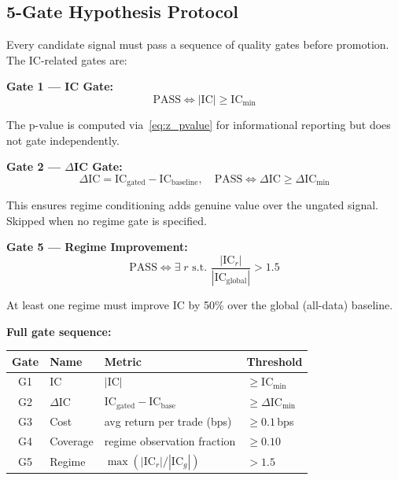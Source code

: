 \documentclass[11pt,a4paper]{article}
\newcommand{\toprule}{\hline\hline}
\newcommand{\midrule}{\hline}
\newcommand{\bottomrule}{\hline\hline}
\begin{document}
\subsection{5-Gate Hypothesis Protocol}

Every candidate signal must pass a sequence of quality gates before
promotion. The IC-related gates are:

\medskip

\textbf{Gate 1 --- IC Gate:}
\begin{equation}
    \text{PASS} \iff |\mathrm{IC}| \geq \mathrm{IC}_{\min}
    \label{eq:gate1}
\end{equation}

The p-value is computed via~\eqref{eq:z_pvalue} for informational
reporting but does not gate independently.

\medskip

\textbf{Gate 2 --- $\Delta$IC Gate:}
\begin{equation}
    \Delta\mathrm{IC} = \mathrm{IC}_{\mathrm{gated}}
        - \mathrm{IC}_{\mathrm{baseline}}, \quad
    \text{PASS} \iff \Delta\mathrm{IC} \geq \Delta\mathrm{IC}_{\min}
    \label{eq:gate2}
\end{equation}

This ensures regime conditioning adds genuine value over the ungated
signal. Skipped when no regime gate is specified.

\medskip

\textbf{Gate 5 --- Regime Improvement:}
\begin{equation}
    \text{PASS} \iff \exists\; r \text{ s.t. }
        \frac{|\mathrm{IC}_r|}{|\mathrm{IC}_{\mathrm{global}}|} > 1.5
    \label{eq:gate5}
\end{equation}

At least one regime must improve IC by 50\% over the global (all-data)
baseline.

\medskip

\textbf{Full gate sequence:}
\begin{center}
\begin{tabular}{clll}
    \toprule
    \textbf{Gate} & \textbf{Name} & \textbf{Metric} & \textbf{Threshold} \\
    \midrule
    G1 & IC & $|\mathrm{IC}|$ & $\geq \mathrm{IC}_{\min}$ \\
    G2 & $\Delta$IC & $\mathrm{IC}_{\mathrm{gated}} - \mathrm{IC}_{\mathrm{base}}$
        & $\geq \Delta\mathrm{IC}_{\min}$ \\
    G3 & Cost & avg return per trade (bps) & $\geq 0.1$\,bps \\
    G4 & Coverage & regime observation fraction & $\geq 0.10$ \\
    G5 & Regime & $\max(|\mathrm{IC}_r| / |\mathrm{IC}_g|)$ & $> 1.5$ \\
    \bottomrule
\end{tabular}
\end{center}
\end{document}
